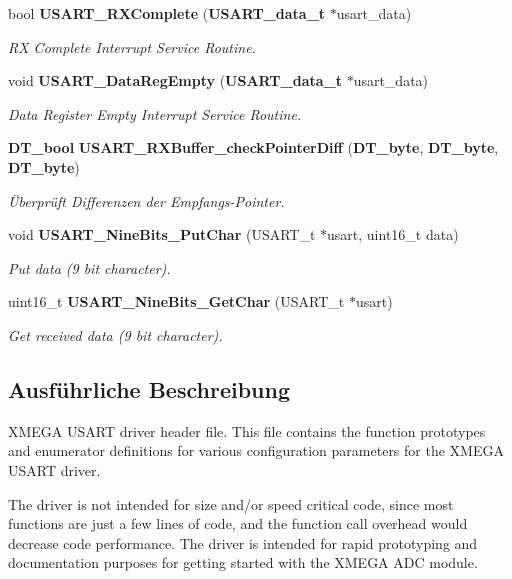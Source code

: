 \begin{DoxyCompactItemize}
bool {\bf USART\_\-RXComplete} ({\bf USART\_\-data\_\-t} $\ast$usart\_\-data)
\begin{DoxyCompactList}\small\item\em RX Complete Interrupt Service Routine. \item\end{DoxyCompactList}\item 
void {\bf USART\_\-DataRegEmpty} ({\bf USART\_\-data\_\-t} $\ast$usart\_\-data)
\begin{DoxyCompactList}\small\item\em Data Register Empty Interrupt Service Routine. \item\end{DoxyCompactList}\item 
{\bf DT\_\-bool} {\bf USART\_\-RXBuffer\_\-checkPointerDiff} ({\bf DT\_\-byte}, {\bf DT\_\-byte}, {\bf DT\_\-byte})
\begin{DoxyCompactList}\small\item\em Überprüft Differenzen der Empfangs-\/Pointer. \item\end{DoxyCompactList}\item 
void {\bf USART\_\-NineBits\_\-PutChar} (USART\_\-t $\ast$usart, uint16\_\-t data)
\begin{DoxyCompactList}\small\item\em Put data (9 bit character). \item\end{DoxyCompactList}\item 
uint16\_\-t {\bf USART\_\-NineBits\_\-GetChar} (USART\_\-t $\ast$usart)
\begin{DoxyCompactList}\small\item\em Get received data (9 bit character). \item\end{DoxyCompactList}\end{DoxyCompactItemize}


\subsection{Ausführliche Beschreibung}
XMEGA USART driver header file. This file contains the function prototypes and enumerator definitions for various configuration parameters for the XMEGA USART driver.

The driver is not intended for size and/or speed critical code, since most functions are just a few lines of code, and the function call overhead would decrease code performance. The driver is intended for rapid prototyping and documentation purposes for getting started with the XMEGA ADC module.

